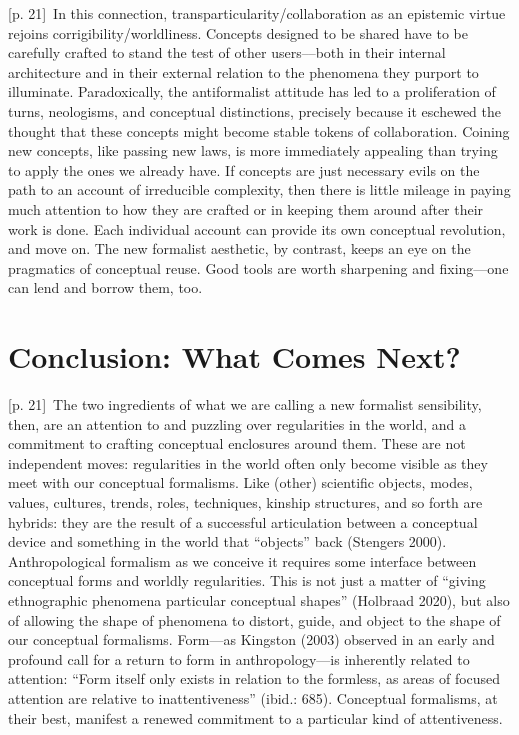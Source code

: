 \documentclass[10pt,a4paper]{article}
\begin{document}
{\scriptsize\color{gray} [p. 21]}\ In this connection, transparticularity/collaboration as an epistemic virtue rejoins corrigibility/worldliness. Concepts designed to be shared have to be carefully crafted to stand the test of other users––both in their internal architecture and in their external relation to the phenomena they purport to illuminate. Paradoxically, the antiformalist attitude has led to a proliferation of turns, neologisms, and conceptual distinctions, precisely because it eschewed the thought that these concepts might become stable tokens of collaboration. Coining new concepts, like passing new laws, is more immediately appealing than trying to apply the ones we already have. If concepts are just necessary evils on the path to an account of irreducible complexity, then there is little mileage in paying much attention to how they are crafted or in keeping them around after their work is done. Each individual account can provide its own conceptual revolution, and move on. The new formalist aesthetic, by contrast, keeps an eye on the pragmatics of conceptual reuse. Good tools are worth sharpening and fixing—one can lend and borrow them, too.\par
{}\section*{Conclusion: What Comes Next?}
{\scriptsize\color{gray} [p. 21]}\ The two ingredients of what we are calling a new formalist sensibility, then, are an attention to and puzzling over regularities in the world, and a commitment to crafting conceptual enclosures around them. These are not independent moves: regularities in the world often only become visible as they meet with our conceptual formalisms. Like (other) scientific objects, modes, values, cultures, trends, roles, techniques, kinship structures, and so forth are hybrids: they are the result of a successful articulation between a conceptual device and something in the world that “objects” back (Stengers 2000). Anthropological formalism as we conceive it requires some interface between conceptual forms and worldly regularities. This is not just a matter of “giving ethnographic phenomena particular conceptual shapes” (Holbraad 2020), but also of allowing the shape of phenomena to distort, guide, and object to the shape of our conceptual formalisms. Form—as Kingston (2003) observed in an early and profound call for a return to form in anthropology—is inherently related to attention: “Form itself only exists in relation to the formless, as areas of focused attention are relative to inattentiveness” (ibid.: 685). Conceptual formalisms, at their best, manifest a renewed commitment to a particular kind of attentiveness.\par
\end{document}
